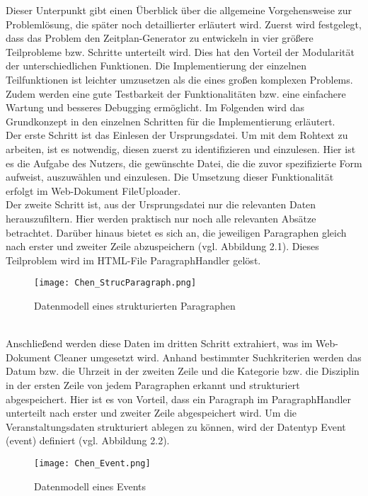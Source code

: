 Dieser Unterpunkt gibt einen Überblick über die allgemeine Vorgehensweise zur Problemlösung, die später noch detaillierter erläutert wird. 
Zuerst wird festgelegt, dass das Problem den Zeitplan-Generator zu entwickeln in vier größere Teilprobleme bzw. Schritte unterteilt wird. Dies hat den Vorteil der Modularität der unterschiedlichen Funktionen. Die Implementierung der einzelnen Teilfunktionen ist leichter umzusetzen als die eines großen komplexen Problems. Zudem werden eine gute Testbarkeit der Funktionalitäten bzw. eine einfachere Wartung und besseres Debugging ermöglicht. Im Folgenden wird das Grundkonzept in den einzelnen Schritten für die Implementierung erläutert.\\
Der erste Schritt ist das Einlesen der Ursprungsdatei. Um mit dem Rohtext zu arbeiten, ist es notwendig, diesen zuerst zu identifizieren und einzulesen. Hier ist es die Aufgabe des Nutzers, die gewünschte Datei, die die zuvor spezifizierte Form aufweist, auszuwählen und einzulesen. Die Umsetzung dieser Funktionalität erfolgt im Web-Dokument FileUploader.\\ 
Der zweite Schritt ist, aus der Ursprungsdatei nur die relevanten Daten herauszufiltern. Hier werden praktisch nur noch alle relevanten Absätze betrachtet. Darüber hinaus bietet es sich an, die jeweiligen Paragraphen gleich nach erster und zweiter Zeile abzuspeichern (vgl. Abbildung 2.1). Dieses Teilproblem wird im HTML-File ParagraphHandler gelöst.
\begin{figure}[htbp]
  \centering
  \texttt{[image: Chen\_StrucParagraph.png]}
  \caption{Datenmodell eines strukturierten Paragraphen}
  \label{fig:Fig1}
\end{figure}\\
Anschließend werden diese Daten im dritten Schritt extrahiert, was im Web-Dokument Cleaner umgesetzt wird. Anhand bestimmter Suchkriterien werden das Datum bzw. die Uhrzeit in der zweiten Zeile und die Kategorie bzw. die Disziplin in der ersten Zeile von jedem Paragraphen erkannt und strukturiert abgespeichert. Hier ist es von Vorteil, dass ein Paragraph im ParagraphHandler unterteilt nach erster und zweiter Zeile abgespeichert wird. Um die Veranstaltungsdaten strukturiert ablegen zu können, wird der Datentyp Event (event) definiert (vgl. Abbildung 2.2).\\
\begin{figure}[htbp]
  \centering
  \texttt{[image: Chen\_Event.png]}
  \caption{Datenmodell eines Events}
  \label{fig:Fig1}
\end{figure}\\
